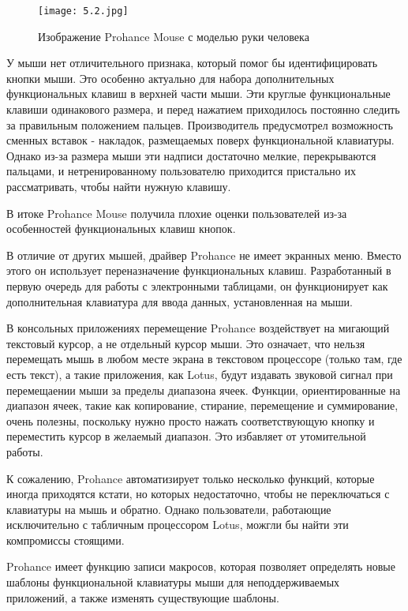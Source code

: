\documentclass[11pt, a4paper]{article}
\begin{document}
    
    \begin{figure}[h]
        \centering
    \texttt{[image: 5.2.jpg]}
        \label{quad-kov}
        \caption{Изображение Prohance Mouse с моделью руки человека}
    \end{figure}
    
    У мыши нет отличительного признака, который помог бы идентифицировать кнопки мыши. Это особенно актуально для набора дополнительных функциональных клавиш в верхней части мыши. Эти круглые функциональные клавиши одинакового размера, и перед нажатием приходилось постоянно следить за правильным положением пальцев. Производитель предусмотрел возможность сменных вставок - накладок, размещаемых поверх функциональной клавиатуры. Однако из-за размера мыши эти надписи достаточно мелкие, перекрываются пальцами, и нетренированному пользователю приходится пристально их рассматривать, чтобы найти нужную клавишу.
    
    В итоке Prohance Mouse получила плохие оценки пользователей из-за особенностей функциональных клавиш  кнопок.
    
    В отличие от других мышей, драйвер Prohance не имеет экранных меню. Вместо этого он использует переназначение функциональных клавиш. Разработанный в первую очередь для работы с электронными таблицами, он функционирует как дополнительная клавиатура для ввода данных, установленная на мыши.
    
    В консольных приложениях перемещение Prohance воздействует на мигающий текстовый курсор, а не  отдельный курсор мыши. Это означает, что нельзя перемещать мышь в любом месте экрана в текстовом процессоре (только там, где есть текст), а такие приложения, как Lotus, будут издавать звуковой сигнал при перемещаении мыши за пределы диапазона ячеек. Функции, ориентированные на диапазон ячеек, такие как копирование, стирание, перемещение и суммирование, очень полезны, поскольку нужно просто нажать соответствующую кнопку и переместить курсор в желаемый диапазон. Это избавляет от утомительной работы. 
    
    К сожалению, Prohance автоматизирует только несколько функций, которые иногда приходятся кстати, но которых недостаточно, чтобы не переключаться с клавиатуры на мышь и обратно. Однако пользователи, работающие исключительно с табличным процессором Lotus, можгли бы найти эти компромиссы стоящими.
    
    Prohance имеет функцию записи макросов, которая позволяет определять новые шаблоны функциональной клавиатуры мыши для неподдерживаемых приложений, а также изменять существующие шаблоны.
    
\end{document}
